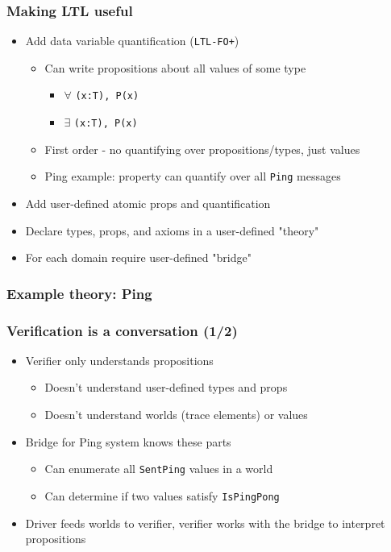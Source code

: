 \documentclass[12pt,aspectratio=169]{beamer}
\begin{document}
\begin{frame}
\frametitle{Making LTL useful}
\begin{itemize}
  \item Add data variable quantification (\texttt{LTL-FO+})
  \begin{itemize}
    \item Can write propositions about all values of some type
    \begin{itemize}
      \item $\forall$ \texttt{(x:T), P(x)}
      \item $\exists$ \texttt{(x:T), P(x)}
    \end{itemize}
    \item First order - no quantifying over propositions/types, just values
    \item Ping example: property can quantify over all \texttt{Ping} messages
  \end{itemize}
  \item Add user-defined atomic props and quantification
  \item Declare types, props, and axioms in a user-defined "theory"
  \item For each domain require user-defined "bridge"
\end{itemize}
\end{frame}

\begin{frame}
\frametitle{Example theory: Ping}
  {\fontsize{10}{12}\selectfont
    
  }
\end{frame}

\begin{frame}
\frametitle{Verification is a conversation (1/2)}
\begin{itemize}
  \item Verifier only understands propositions
  \begin{itemize}
    \item Doesn't understand user-defined types and props
    \item Doesn't understand worlds (trace elements) or values
  \end{itemize}
  \item Bridge for Ping system knows these parts
  \begin{itemize}
    \item Can enumerate all \texttt{SentPing} values in a world
    \item Can determine if two values satisfy \texttt{IsPingPong}
  \end{itemize}
  \item Driver feeds worlds to verifier, verifier works with the bridge to interpret propositions
\end{itemize}
\end{frame}
\end{document}
